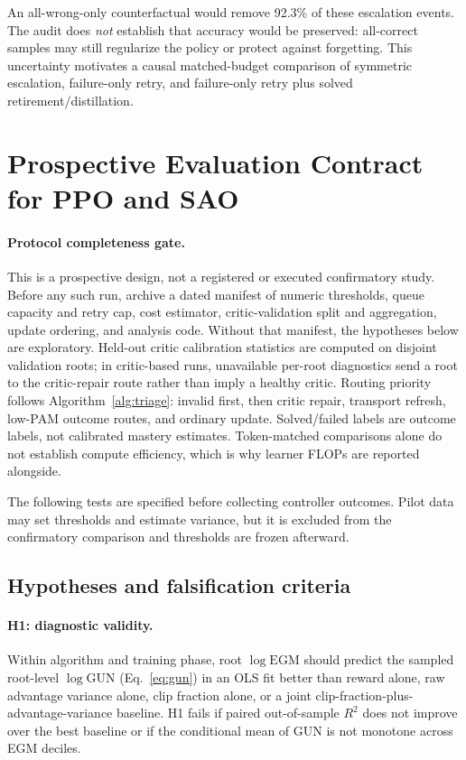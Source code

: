 \documentclass{article}
\newcommand{\egm}{\mathrm{EGM}}
\begin{document}
An all-wrong-only counterfactual would remove 92.3\% of these escalation
events.  The audit does \emph{not} establish that accuracy would be preserved:
all-correct samples may still regularize the policy or protect against
forgetting.  This uncertainty motivates a causal matched-budget comparison of
symmetric escalation, failure-only retry, and failure-only retry plus solved
retirement/distillation.

\section{Prospective Evaluation Contract for PPO and SAO}
\label{sec:prereg}

\paragraph{Protocol completeness gate.}
This is a prospective design, not a registered or executed confirmatory
study. Before any such run, archive a dated manifest of numeric thresholds,
queue capacity and retry cap, cost estimator, critic-validation split and
aggregation, update ordering, and analysis code. Without that manifest,
the hypotheses below are exploratory. Held-out critic calibration statistics
are computed on disjoint validation roots; in critic-based runs, unavailable
per-root diagnostics send a root to the critic-repair route rather than imply
a healthy critic. Routing priority follows Algorithm~\ref{alg:triage}: invalid
first, then critic repair, transport refresh, low-PAM outcome routes, and
ordinary update. Solved/failed labels are outcome labels, not calibrated
mastery estimates. Token-matched comparisons alone do not establish compute
efficiency, which is why learner FLOPs are reported alongside.

The following tests are specified before collecting controller outcomes.
Pilot data may set thresholds and estimate variance, but it is excluded from
the confirmatory comparison and thresholds are frozen afterward.

\subsection{Hypotheses and falsification criteria}

\paragraph{H1: diagnostic validity.}
Within algorithm and training phase, root $\log\egm$ should predict the
sampled root-level $\log\mathrm{GUN}$ (Eq.~\eqref{eq:gun}) in an OLS fit better
than reward alone, raw advantage variance alone, clip fraction alone, or a joint
clip-fraction-plus-advantage-variance baseline.  H1 fails if paired
out-of-sample $R^2$ does not improve over the best baseline or if the conditional
mean of GUN is not monotone across EGM deciles.
\end{document}
